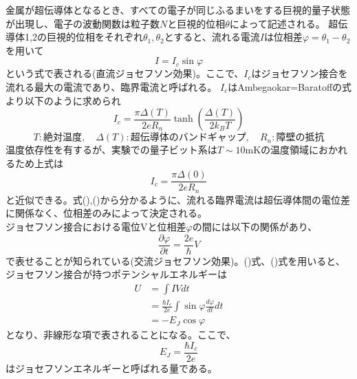         金属が超伝導体となるとき、すべての電子が同じふるまいをする巨視的量子状態が出現し、電子の波動関数は粒子数$N$と巨視的位相$\theta$によって記述される。
        超伝導体1,2の巨視的位相をそれぞれ$\theta_1,\theta_2$とすると、流れる電流$I$は位相差$\varphi=\theta_1-\theta_2$を用いて
        \begin{equation}
            I=I_c \sin\varphi
        \end{equation}
        という式で表される(直流ジョセフソン効果)。ここで、$I_c$はジョセフソン接合を流れる最大の電流であり、臨界電流と呼ばれる。
        $I_c$はAmbegaokar=Baratoffの式より以下のように求められ
        \begin{equation}
            I_c=\frac{\pi \Delta(T)}{2eR_n}\tanh(\frac{\Delta(T)}{2k_BT})
        \end{equation}
        \begin{equation*}
            T:\mathrm{絶対温度},\quad \Delta(T):超伝導体のバンドギャップ,\quad R_n:障壁の抵抗
        \end{equation*}
        温度依存性を有するが、実験での量子ビット系は$T \sim 10$mKの温度領域におかれるため上式は
        \begin{equation}
            I_c=\frac{\pi \Delta(0)}{2eR_n}
        \end{equation}
        と近似できる。式(),()から分かるように、流れる臨界電流は超伝導体間の電位差に関係なく、位相差のみによって決定される。\\
        ジョセフソン接合における電位Vと位相差$\varphi$の間には以下の関係があり、
        \begin{equation}
            \frac{\partial\varphi}{\partial t}=\frac{2e}{\hbar}V
        \end{equation}
        で表せることが知られている(交流ジョセフソン効果)。()式、()式を用いると、ジョセフソン接合が持つポテンシャルエネルギーは
        \begin{equation}
        \begin{split}
            U&=\int IVdt \\
            &= \frac{\hbar I_c}{2e}\int \sin \varphi \frac{d\varphi}{dt}dt \\
            &= -E_J \cos \varphi
        \end{split}
        \end{equation}
        となり、非線形な項で表されることになる。ここで、
        \begin{equation}
            E_J=\frac{\hbar I_c}{2e}
        \end{equation}
        はジョセフソンエネルギーと呼ばれる量である。\\
